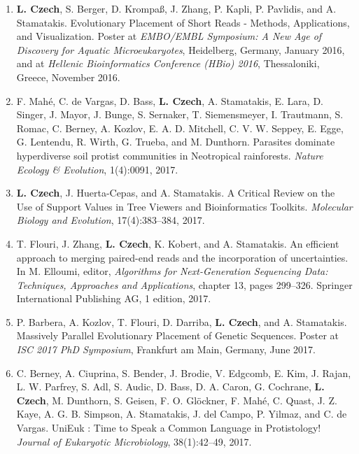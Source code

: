 \begin{enumerate}
    \item \textbf{L. Czech}, S. Berger, D. Krompaß, J. Zhang, P. Kapli, P. Pavlidis, and A. Stamatakis.
        Evolutionary Placement of Short Reads - Methods, Applications, and Visualization.
        Poster at \textit{EMBO/EMBL Symposium: A New Age of Discovery for Aquatic Microeukaryotes}, Heidelberg, Germany, January 2016,
        and at \textit{Hellenic Bioinformatics Conference (HBio) 2016}, Thessaloniki, Greece, November 2016.

    \item F. Mah{\'{e}}, C. de Vargas, D. Bass, \textbf{L. Czech}, A. Stamatakis, E. Lara, D. Singer, J. Mayor, J. Bunge,
        S. Sernaker, T. Siemensmeyer, I. Trautmann, S. Romac, C. Berney, A. Kozlov, E. A. D. Mitchell, C. V. W. Seppey,
        E. Egge, G. Lentendu, R. Wirth, G. Trueba, and M. Dunthorn.
        Parasites dominate hyperdiverse soil protist communities in Neotropical rainforests.
        \textit{Nature Ecology \& Evolution}, 1(4):0091, 2017. \cite{Mahe2017}

    \item \textbf{L. Czech}, J. Huerta-Cepas, and A. Stamatakis.
        A Critical Review on the Use of Support Values in Tree Viewers and Bioinformatics Toolkits.
        \textit{Molecular Biology and Evolution}, 17(4):383--384, 2017. \cite{Czech2017}

    \item T. Flouri, J. Zhang, \textbf{L. Czech}, K. Kobert, and A. Stamatakis.
        An efficient approach to merging paired-end reads and the incorporation of uncertainties.
        In M. Elloumi, editor, \textit{Algorithms for Next-Generation Sequencing Data: Techniques, Approaches and Applications},
        chapter 13, pages 299--326. Springer International Publishing AG, 1 edition, 2017. \cite{Flouri2017}

    \item P. Barbera, A. Kozlov, T. Flouri, D. Darriba, \textbf{L. Czech}, and A. Stamatakis.
        Massively Parallel Evolutionary Placement of Genetic Sequences.
        Poster at \textit{ISC 2017 PhD Symposium}, Frankfurt am Main, Germany, June 2017.

    \item C. Berney, A. Ciuprina, S. Bender, J. Brodie, V. Edgcomb, E. Kim, J. Rajan, L. W. Parfrey, S. Adl, S. Audic,
        D. Bass, D. A. Caron, G. Cochrane, \textbf{L. Czech}, M. Dunthorn, S. Geisen, F. O. Glöckner, F. Mah{\'{e}}, C. Quast,
        J. Z. Kaye, A. G. B. Simpson, A. Stamatakis, J. del Campo, P. Yilmaz, and C. de Vargas.
        UniEuk : Time to Speak a Common Language in Protistology!
        \textit{Journal of Eukaryotic Microbiology}, 38(1):42--49, 2017. \cite{Berney2017}


\end{enumerate}
